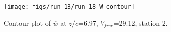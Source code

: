\begin{figure}[H]
\centering
\texttt{[image: figs/run\_18/run\_18\_W\_contour]}
\caption{Contour plot of $\overline{w}$ at $z/c$=6.97, $V_{free}$=29.12, station 2.}
\label{fig:run_18_W_contour}
\end{figure}


